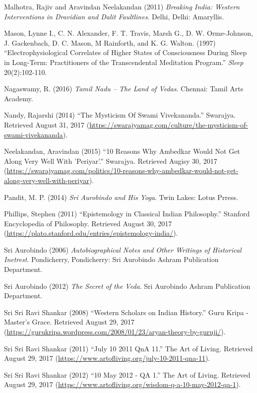 \begin{thebibliography}{99}
  Malhotra, Rajiv and Aravindan Neelakandan (2011) \textit{Breaking India: Western Interventions in Dravidian and Dalit Faultlines}. Delhi, Delhi: Amaryllis.

  Mason, Lynne I., C. N. Alexander, F. T. Travis, Marsh G., D. W. Orme-Johnson, J. Gackenbach, D. C. Mason, M Rainforth, and K. G. Walton. (1997) “Electrophysiological Correlates of Higher States of Consciousness During Sleep in Long-Term: Practitioners of the Transcendental Meditation Program.” \textit{Sleep} 20(2):102-110.

  Nagaswamy, R. (2016) \textit{Tamil Nadu – The Land of Vedas}. Chennai: Tamil Arts Academy.

  Nandy, Rajarshi (2014) “The Mysticism Of Swami Vivekananda.” Swarajya. Retrieved August 31, 2017 (\url{https://swarajyamag.com/culture/the-mysticism-of-swami-vivekananda}).

  Neelakandan, Aravindan (2015) “10 Reasons Why Ambedkar Would Not Get Along Very Well With 'Periyar'.” Swarajya. Retrieved Augisy 30, 2017 (\url{https://swarajyamag.com/politics/10-reasons-why-ambedkar-would-not-get-along-very-well-with-periyar}).

  Pandit, M. P. (2014) \textit{Sri Aurobindo and His Yoga}. Twin Lakes: Lotus Prress.

  Phillips, Stephen (2011) “Epistemology in Classical Indian Philosophy.” Stanford Encyclopedia of Philosophy. Retrieved August 30, 2017 (\url{https://plato.stanford.edu/entries/epistemology-india/}).

  Sri Aurobindo (2006) \textit{Autobiographical Notes and Other Writings of Historical Inetrest}. Pondicherry, Pondicherry: Sri Aurobindo Ashram Publication Department.

  Sri Aurobindo (2012) \textit{The Secret of the Veda}. Sri Aurobindo Ashram Publication Department.

  Sri Sri Ravi Shankar (2008) “Western Scholars on Indian History.” Guru Kripa - Master's Grace. Retrieved August 29, 2017 (\url{https://gurukripa.wordpress.com/2008/01/23/aryan-theory-by-guruji/}).

  Sri Sri Ravi Shankar (2011) “July 10 2011 QnA 11.” The Art of Living. Retrieved August 29, 2017 (\url{https://www.artofliving.org/july-10-2011-qna-11}).

  Sri Sri Ravi Shankar (2012) “10 May 2012 - QA 1.” The Art of Living. Retrieved August 29, 2017 (\url{https://www.artofliving.org/wisdom-q-a-10-may-2012-qa-1}).


\end{thebibliography}
